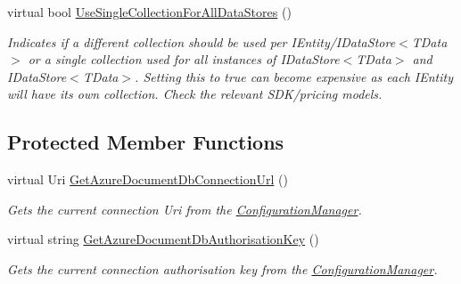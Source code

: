 \begin{DoxyCompactItemize}
virtual bool \hyperlink{classCqrs_1_1Azure_1_1DocumentDb_1_1Factories_1_1AzureDocumentDbDataStoreConnectionStringFactory_aa7b4b3eca609a815358af227b0f53909_aa7b4b3eca609a815358af227b0f53909}{Use\+Single\+Collection\+For\+All\+Data\+Stores} ()
\begin{DoxyCompactList}\small\item\em Indicates if a different collection should be used per I\+Entity/I\+Data\+Store$<$\+T\+Data$>$ or a single collection used for all instances of I\+Data\+Store$<$\+T\+Data$>$ and I\+Data\+Store$<$\+T\+Data$>$. Setting this to true can become expensive as each I\+Entity will have it\textquotesingle{}s own collection. Check the relevant S\+D\+K/pricing models. \end{DoxyCompactList}\end{DoxyCompactItemize}
\subsection*{Protected Member Functions}
\begin{DoxyCompactItemize}
\item 
virtual Uri \hyperlink{classCqrs_1_1Azure_1_1DocumentDb_1_1Factories_1_1AzureDocumentDbDataStoreConnectionStringFactory_af5d090f6195c7b59183db1eec8dcafc0_af5d090f6195c7b59183db1eec8dcafc0}{Get\+Azure\+Document\+Db\+Connection\+Url} ()
\begin{DoxyCompactList}\small\item\em Gets the current connection Uri from the \hyperlink{namespaceCqrs_1_1Azure_1_1ConfigurationManager}{Configuration\+Manager}. \end{DoxyCompactList}\item 
virtual string \hyperlink{classCqrs_1_1Azure_1_1DocumentDb_1_1Factories_1_1AzureDocumentDbDataStoreConnectionStringFactory_a794c6926a7b29f927d41a0160716972a_a794c6926a7b29f927d41a0160716972a}{Get\+Azure\+Document\+Db\+Authorisation\+Key} ()
\begin{DoxyCompactList}\small\item\em Gets the current connection authorisation key from the \hyperlink{namespaceCqrs_1_1Azure_1_1ConfigurationManager}{Configuration\+Manager}. \end{DoxyCompactList}\end{DoxyCompactItemize}
